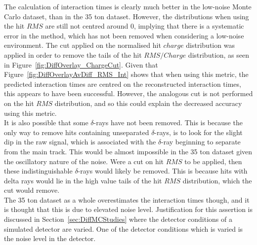 The calculation of interaction times is clearly much better in the low-noise Monte Carlo dataset, than in the 35 ton dataset. However, the distributions when using the hit $RMS$ are still not centred around 0, implying that there is a systematic error in the method, which has not been removed when considering a low-noise environment. The cut applied on the normalised hit $charge$ distribution was applied in order to remove the tails of the hit $RMS/Charge$ distribution, as seen in Figure~\ref{fig:DiffOverlay_ChargeCut}. Given that Figure~\ref{fig:DiffOverlayAvDiff_RMS_Int} shows that when using this metric, the predicted interaction times are centred on the reconstructed interaction times, this appears to have been successful. However, the analogous cut is not performed on the hit $RMS$ distribution, and so this could explain the decreased accuracy using this metric. \\

It is also possible that some $\delta$-rays have not been removed. This is because the only way to remove hits containing unseparated $\delta$-rays, is to look for the slight dip in the raw signal, which is associated with the $\delta$-ray beginning to separate from the main track. This would be almost impossible in the 35 ton dataset given the oscillatory nature of the noise. Were a cut on hit $RMS$ to be applied, then these indistinguishable $\delta$-rays would likely be removed. This is because hits with delta rays would lie in the high value tails of the hit $RMS$ distribution, which the cut would remove. \\

The 35 ton dataset as a whole overestimates the interaction times though, and it is thought that this is due to elevated noise level. Justification for this assertion is discussed in Section~\ref{sec:DiffMCStudies} where the detector conditions of a simulated detector are varied. One of the detector conditions which is varied is the noise level in the detector. \\

